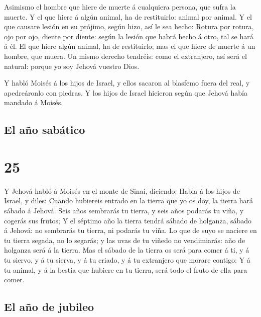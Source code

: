  Asimismo el hombre que hiere de muerte á cualquiera
persona, que sufra la muerte.  Y el que hiere á algún
animal, ha de restituirlo: animal por animal.  Y el que
causare lesión en su prójimo, según hizo, así le sea hecho:
 Rotura por rotura, ojo por ojo, diente por diente: según
la lesión que habrá hecho á otro, tal se hará á él.  El
que hiere algún animal, ha de restituirlo; mas el que hiere de muerte á
un hombre, que muera.  Un mismo derecho tendréis: como el
extranjero, así será el natural: porque yo soy Jehová vuestro Dios.

 Y habló Moisés á los hijos de Israel, y ellos sacaron al
blasfemo fuera del real, y apedreáronlo con piedras. Y los hijos de
Israel hicieron según que Jehová había mandado á Moisés.

\hypertarget{el-auxf1o-sabuxe1tico}{%
\subsection{El año sabático}\label{el-auxf1o-sabuxe1tico}}

\hypertarget{section-24}{%
\section{25}\label{section-24}}

 Y Jehová habló á Moisés en el monte de Sinaí, diciendo:
 Habla á los hijos de Israel, y diles: Cuando hubiereis
entrado en la tierra que yo os doy, la tierra hará sábado á Jehová.
 Seis años sembrarás tu tierra, y seis años podarás tu
viña, y cogerás sus frutos;  Y el séptimo año la tierra
tendrá sábado de holganza, sábado á Jehová: no sembrarás tu tierra, ni
podarás tu viña.  Lo que de suyo se naciere en tu tierra
segada, no lo segarás; y las uvas de tu viñedo no vendimiarás: año de
holganza será á la tierra.  Mas el sábado de la tierra os
será para comer á ti, y á tu siervo, y á tu sierva, y á tu criado, y á
tu extranjero que morare contigo:  Y á tu animal, y á la
bestia que hubiere en tu tierra, será todo el fruto de ella para comer.

\hypertarget{el-auxf1o-de-jubileo}{%
\subsection{El año de jubileo}\label{el-auxf1o-de-jubileo}}

